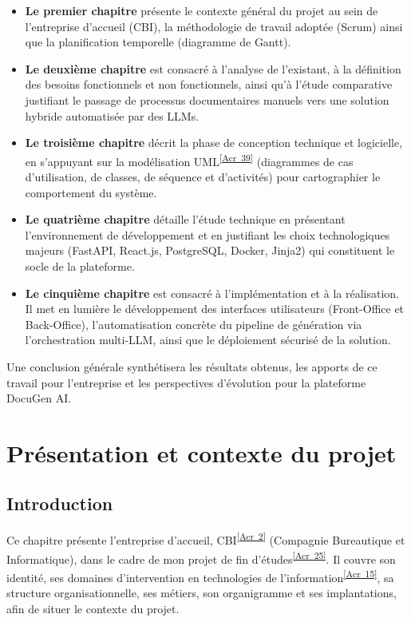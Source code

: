 \documentclass[12pt, a4paper]{report}
\newcommand{\acref}[1]{\textsuperscript{\hyperlink{acr:#1}{[Acr~#1]}}}
\begin{document}
\begin{itemize}
    \item \textbf{Le premier chapitre} présente le contexte général du projet au sein de l'entreprise d'accueil (CBI), la méthodologie de travail adoptée (Scrum) ainsi que la planification temporelle (diagramme de Gantt).
    
    \item \textbf{Le deuxième chapitre} est consacré à l'analyse de l'existant, à la définition des besoins fonctionnels et non fonctionnels, ainsi qu'à l'étude comparative justifiant le passage de processus documentaires manuels vers une solution hybride automatisée par des LLMs.
    
    \item \textbf{Le troisième chapitre} décrit la phase de conception technique et logicielle, en s'appuyant sur la modélisation UML\acref{39} (diagrammes de cas d'utilisation, de classes, de séquence et d'activités) pour cartographier le comportement du système.
    
    \item \textbf{Le quatrième chapitre} détaille l'étude technique en présentant l'environnement de développement et en justifiant les choix technologiques majeurs (FastAPI, React.js, PostgreSQL, Docker, Jinja2) qui constituent le socle de la plateforme.
    
    \item \textbf{Le cinquième chapitre} est consacré à l'implémentation et à la réalisation. Il met en lumière le développement des interfaces utilisateurs (Front-Office et Back-Office), l'automatisation concrète du pipeline de génération via l'orchestration multi-LLM, ainsi que le déploiement sécurisé de la solution.
\end{itemize}

Une conclusion générale synthétisera les résultats obtenus, les apports de ce travail pour l'entreprise et les perspectives d'évolution pour la plateforme DocuGen AI.





\chapter{Présentation et contexte du projet}

\section*{Introduction}
Ce chapitre présente l'entreprise d'accueil, CBI\acref{2} (Compagnie Bureautique et Informatique), dans le cadre de mon projet de fin d'études\acref{25}. Il couvre son identité, ses domaines d'intervention en technologies de l'information\acref{15}, sa structure organisationnelle, ses métiers, son organigramme et ses implantations, afin de situer le contexte du projet.
\end{document}
